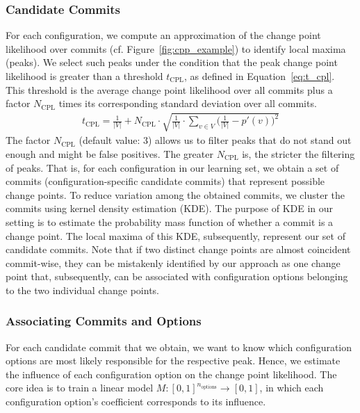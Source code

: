 \documentclass[sigconf]{acmart}
\begin{document}
	\subsubsection{Candidate Commits}
	For each configuration, we compute an approximation of the change point likelihood over commits (cf. Figure~\ref{fig:cpp_example}) to identify local maxima (peaks). We select such peaks under the condition that the peak change point likelihood is greater than a  threshold $t_\text{CPL}$, as defined in Equation~\ref{eq:t_cpl}. This threshold is the average change point likelihood over all commits plus a factor $N_\text{CPL}$ times its corresponding standard deviation over all commits. 
	\begin{equation}
	\begin{gathered}
	t_\text{CPL} = \frac{1}{\vert V\vert} + N_\text{CPL} \cdot \sqrt{\frac{1}{\vert V\vert} \cdot \sum_{v \in V} \Big(\frac{1}{\vert V\vert} - p'(v)\Big)^2}
		\label{eq:t_cpl}
	\end{gathered}
	\end{equation}
	The factor $N_\text{CPL}$ (default value: 3) allows us to filter peaks that do not stand out enough and might be false positives. The greater $N_\text{CPL}$ is, the stricter the filtering of peaks. That is, for each configuration in our learning set, we obtain a set of commits (configuration-specific candidate commits) that represent possible change points.
	To reduce variation among the obtained commits, we cluster the commits using kernel density estimation (KDE). The purpose of KDE in our setting is to estimate the probability mass function of whether a commit is a change point. The local maxima of this KDE, subsequently, represent our set of candidate commits. {\color{red}Note that if two distinct change points are almost coincident commit-wise, they can be mistakenly identified by our approach as one change point that, subsequently, can be associated with configuration options belonging to the two individual change points. }
	
	\subsubsection{Associating Commits and Options}
	For each candidate commit that we obtain, we want to know which configuration options are most likely responsible for the respective peak. Hence, we estimate the influence  of each configuration option on the change point likelihood. The core idea is to train a linear model $M: [0,1]^{n_{\text{options}}} \rightarrow [0,1]$, in which each configuration option's coefficient corresponds to its influence. 
	
\end{document}
